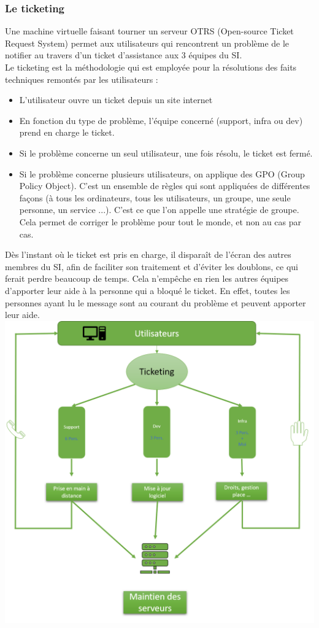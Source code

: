 \subsubsection{Le ticketing}
Une machine virtuelle faisant tourner un serveur OTRS (Open-source Ticket Request System) permet aux utilisateurs qui rencontrent un problème de le notifier au travers d'un ticket d'assistance aux 3 équipes du SI. \\
Le ticketing est la méthodologie qui est employée pour la résolutions des faits techniques remontés par les utilisateurs :
\begin{itemize}
    \item L'utilisateur ouvre un ticket depuis un site internet
    \item En fonction du type de problème, l'équipe concerné (support, infra ou dev) prend en charge le ticket.
    \item Si le problème concerne un seul utilisateur, une fois résolu, le ticket est fermé.
    \item Si le problème concerne plusieurs utilisateurs, on applique des GPO (Group Policy Object). C'est un ensemble de règles qui sont appliquées de différentes façons (à tous les ordinateurs, tous les utilisateurs, un groupe, une seule personne, un service ...). C'est ce que l'on appelle une stratégie de groupe. Cela permet de corriger le problème pour tout le monde, et non au cas par cas.
\end{itemize}
Dès l'instant où le ticket est pris en charge, il disparaît de l'écran des autres membres du SI, afin de faciliter son traitement et d'éviter les doublons, ce qui ferait perdre beaucoup de temps. Cela n'empêche en rien les autres équipes d'apporter leur aide à la personne qui a bloqué le ticket. En effet, toutes les personnes ayant lu le message sont au courant du problème et peuvent apporter leur aide.\\
\vspace{2\baselineskip}
\includegraphics[width=15cm]{./images/orga.png}
\newpage

